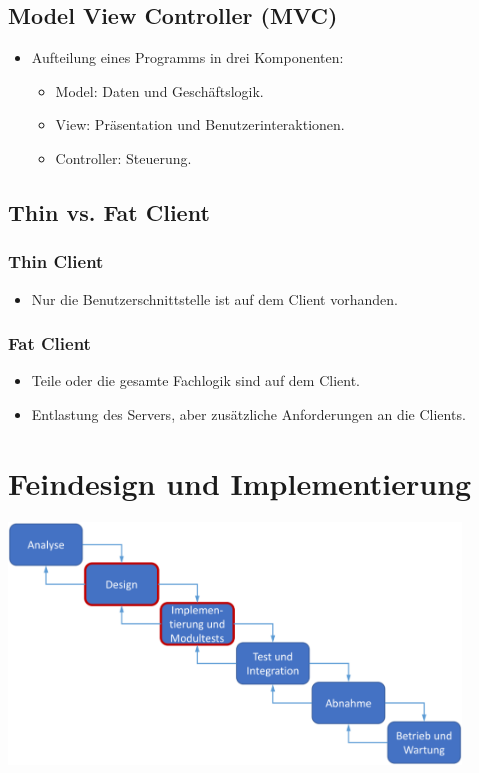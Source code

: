 \documentclass[11pt, a4paper]{article}
\begin{document}
\subsection{Model View Controller (MVC)}

\begin{itemize}
    \item Aufteilung eines Programms in drei Komponenten:
    \begin{itemize}
        \item Model: Daten und Geschäftslogik.
        \item View: Präsentation und Benutzerinteraktionen.
        \item Controller: Steuerung.
    \end{itemize}
\end{itemize}


\subsection{Thin vs. Fat Client}
\subsubsection{Thin Client}
\begin{itemize}
    \item Nur die Benutzerschnittstelle ist auf dem Client vorhanden.
\end{itemize}

\subsubsection{Fat Client}
\begin{itemize}
    \item Teile oder die gesamte Fachlogik sind auf dem Client.
    \item Entlastung des Servers, aber zusätzliche Anforderungen an die Clients.
\end{itemize}

\vspace{4em}

\raggedright \section{Feindesign und Implementierung} %

\centering \includegraphics[width=0.9\textwidth]{Feindesign-00.png}
\end{document}
